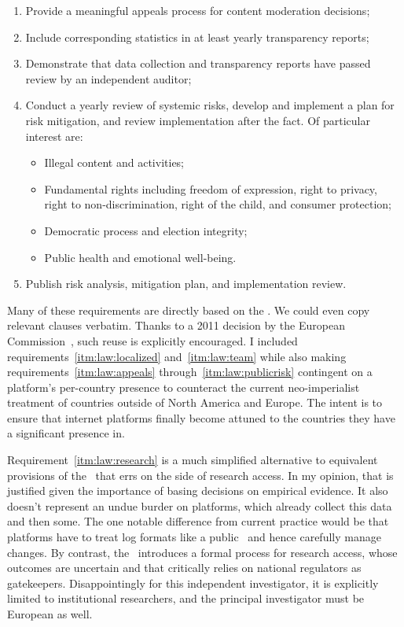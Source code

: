\begin{enumerate}[resume]
    \item Provide a meaningful appeals process for content moderation decisions;
        \label{itm:law:appeals}
    \item Include corresponding statistics in at least yearly transparency
        reports;
    \item Demonstrate that data collection and transparency reports have passed
        review by an independent auditor;
    \item Conduct a yearly review of systemic risks, develop and implement a
        plan for risk mitigation, and review implementation after the fact. Of
        particular interest are:
        \begin{itemize}
            \item Illegal content and activities;
            \item Fundamental rights including freedom of expression, right to
                privacy, right to non-discrimination, right of the child, and
                consumer protection;
            \item Democratic process and election integrity;
            \item Public health and emotional well-being.
        \end{itemize}
    \item Publish risk analysis, mitigation plan, and implementation review.
        \label{itm:law:publicrisk}
\end{enumerate}
Many of these requirements are directly based on the \DSA. We could even copy
relevant clauses verbatim. Thanks to a 2011 decision by the European
Commission~\cite{EuropeanCommission2011}, such reuse is explicitly encouraged. I
included requirements~\ref{itm:law:localized} and~\ref{itm:law:team} while also
making requirements~\ref{itm:law:appeals} through~\ref{itm:law:publicrisk}
contingent on a platform's per-country presence to counteract the current
neo-imperialist treatment of countries outside of North America and Europe. The
intent is to ensure that internet platforms finally become attuned to the
countries they have a significant presence in.

Requirement~\ref{itm:law:research} is a much simplified alternative to
equivalent provisions of the \DSA\ that errs on the side of research access. In
my opinion, that is justified given the importance of basing decisions on
empirical evidence. It also doesn't represent an undue burder on platforms,
which already collect this data and then some. The one notable difference from
current practice would be that platforms have to treat log formats like a public
\API\ and hence carefully manage changes. By contrast, the \DSA\ introduces a
formal process for research access, whose outcomes are uncertain and that
critically relies on national regulators as gatekeepers. Disappointingly for
this independent investigator, it is explicitly limited to institutional
researchers, and the principal investigator must be European as well.

